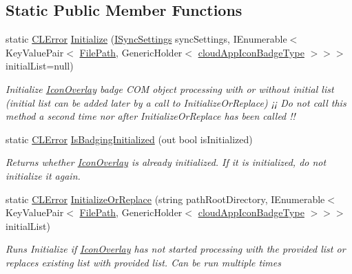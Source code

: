 \subsection*{Static Public Member Functions}
\begin{DoxyCompactItemize}
\item 
static \hyperlink{class_cloud_api_public_1_1_model_1_1_c_l_error}{C\-L\-Error} \hyperlink{class_cloud_api_public_1_1_badge_n_e_t_1_1_icon_overlay_a0a8528ffadca5944cf5ae96893a0ebae}{Initialize} (\hyperlink{interface_cloud_api_public_1_1_interfaces_1_1_i_sync_settings}{I\-Sync\-Settings} sync\-Settings, I\-Enumerable$<$ Key\-Value\-Pair$<$ \hyperlink{class_cloud_api_public_1_1_model_1_1_file_path}{File\-Path}, Generic\-Holder$<$ \hyperlink{namespace_cloud_api_public_1_1_badge_n_e_t_afab91a750338fef6bd4ef08f5381c4e4}{cloud\-App\-Icon\-Badge\-Type} $>$$>$$>$ initial\-List=null)
\begin{DoxyCompactList}\small\item\em Initialize \hyperlink{class_cloud_api_public_1_1_badge_n_e_t_1_1_icon_overlay}{Icon\-Overlay} badge C\-O\-M object processing with or without initial list (initial list can be added later by a call to Initialize\-Or\-Replace) ¡¡ Do not call this method a second time nor after Initialize\-Or\-Replace has been called !! \end{DoxyCompactList}\item 
static \hyperlink{class_cloud_api_public_1_1_model_1_1_c_l_error}{C\-L\-Error} \hyperlink{class_cloud_api_public_1_1_badge_n_e_t_1_1_icon_overlay_af9c443529da96d9b3961d065b2e4205d}{Is\-Badging\-Initialized} (out bool is\-Initialized)
\begin{DoxyCompactList}\small\item\em Returns whether \hyperlink{class_cloud_api_public_1_1_badge_n_e_t_1_1_icon_overlay}{Icon\-Overlay} is already initialized. If it is initialized, do not initialize it again. \end{DoxyCompactList}\item 
static \hyperlink{class_cloud_api_public_1_1_model_1_1_c_l_error}{C\-L\-Error} \hyperlink{class_cloud_api_public_1_1_badge_n_e_t_1_1_icon_overlay_ad75df3cb907cd47580f35b2571fe5add}{Initialize\-Or\-Replace} (string path\-Root\-Directory, I\-Enumerable$<$ Key\-Value\-Pair$<$ \hyperlink{class_cloud_api_public_1_1_model_1_1_file_path}{File\-Path}, Generic\-Holder$<$ \hyperlink{namespace_cloud_api_public_1_1_badge_n_e_t_afab91a750338fef6bd4ef08f5381c4e4}{cloud\-App\-Icon\-Badge\-Type} $>$$>$$>$ initial\-List)
\begin{DoxyCompactList}\small\item\em Runs Initialize if \hyperlink{class_cloud_api_public_1_1_badge_n_e_t_1_1_icon_overlay}{Icon\-Overlay} has not started processing with the provided list or replaces existing list with provided list. Can be run multiple times \end{DoxyCompactList}\item 

\end{DoxyCompactItemize}
